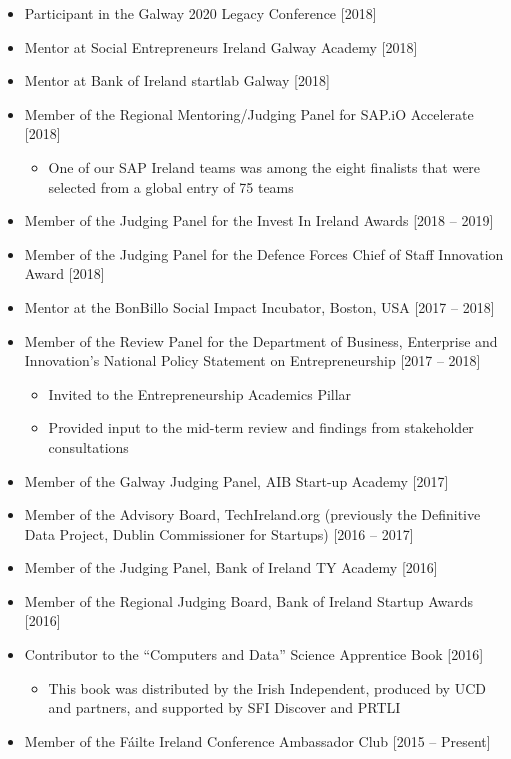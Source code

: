 \documentclass[10pt,a4paper]{res} %
\begin{document}
\begin{resume}
\begin{itemize}
\item Participant in the Galway 2020 Legacy Conference [2018]
\item Mentor at Social Entrepreneurs Ireland Galway Academy [2018]
\item Mentor at Bank of Ireland startlab Galway [2018]
\item Member of the Regional Mentoring/Judging Panel for SAP.iO Accelerate [2018]
\begin{itemize} \itemsep -2pt
\item One of our SAP Ireland teams was among the eight finalists that were selected from a global entry of 75 teams
\end{itemize}
\item Member of the Judging Panel for the Invest In Ireland Awards [2018 -- 2019]
\item Member of the Judging Panel for the Defence Forces Chief of Staff Innovation Award [2018]
\item Mentor at the BonBillo Social Impact Incubator, Boston, USA [2017 -- 2018]
\item Member of the Review Panel for the Department of Business, Enterprise and Innovation's National Policy Statement on Entrepreneurship [2017 -- 2018]
\begin{itemize} \itemsep -2pt
\item Invited to the Entrepreneurship Academics Pillar
\item Provided input to the mid-term review and findings from stakeholder consultations
\end{itemize}
\item Member of the Galway Judging Panel, AIB Start-up Academy [2017]
\item Member of the Advisory Board, TechIreland.org (previously the Definitive Data Project, Dublin Commissioner for Startups) [2016 -- 2017]
\item Member of the Judging Panel, Bank of Ireland TY Academy [2016]
\item Member of the Regional Judging Board, Bank of Ireland Startup Awards [2016]
\item Contributor to the ``Computers and Data'' Science Apprentice Book [2016]
\begin{itemize} \itemsep -2pt
\item This book was distributed by the Irish Independent, produced by UCD and partners, and supported by SFI Discover and PRTLI
\end{itemize}
\item Member of the F\'{a}ilte Ireland Conference Ambassador Club [2015 -- Present]

\end{itemize}
\end{resume}
\end{document}
